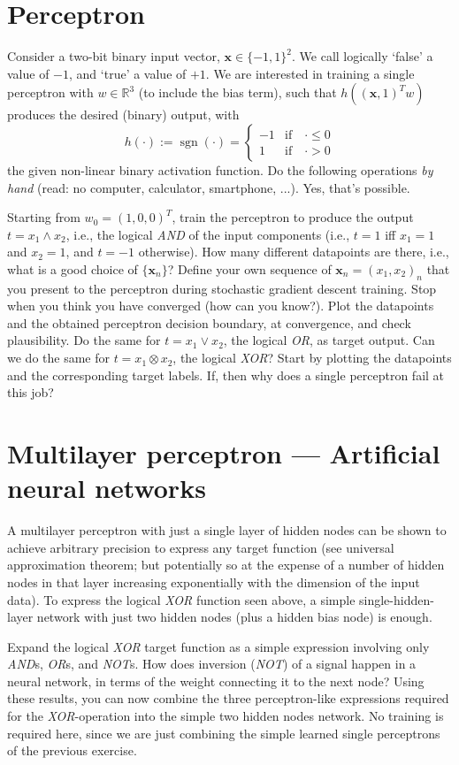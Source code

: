 \documentclass[11pt,noanswers,addpoints]{exam}
\DeclareMathOperator{\sgn}{sgn}
\newcommand{\R}{\mathbb R}
\newcommand{\x}{\mathbf x}
\begin{document}
\section{Perceptron}
Consider a two-bit binary input vector, $\x \in \{-1,1\}^2$. We call logically `false' a value of $-1$, and `true' a value of $+1$. We are interested in training a single perceptron with $w\in\R^3$ (to include the bias term), such that $h( (\x,1)^Tw )$ produces the desired (binary) output, with $$h(\cdot):=\sgn(\cdot)=\begin{cases}-1&\text{if} \quad \cdot \leq 0\\ 1& \text{if} \quad \cdot > 0 \end{cases}$$ the given non-linear binary activation function. Do the following operations \emph{by hand} (read: no computer, calculator, smartphone, ...). Yes, that's possible.
\begin{questions}
\question Starting from $w_0=(1,0,0)^T$, train the perceptron to produce the output $t=x_1\wedge x_2$, i.e., the logical \emph{AND} of the input components (i.e., $t=1$ iff $x_1=1$ and $x_2=1$, and $t=-1$ otherwise). How many different datapoints are there, i.e., what is a good choice of $\{\x_n\}$? Define your own sequence of $\x_n=(x_1,x_2)_n$ that you present to the perceptron during stochastic gradient descent training. Stop when you think you have converged (how can you know?). Plot the datapoints and the obtained perceptron decision boundary, at convergence, and check plausibility.
\question Do the same for $t=x_1\vee x_2$, the logical \emph{OR}, as target output.
\question Can we do the same for $t=x_1\otimes x_2$, the logical \emph{XOR}? Start by plotting the datapoints and the corresponding target labels. If, then why does a single perceptron fail at this job?
\end{questions}



\section{Multilayer perceptron --- Artificial neural networks}
A multilayer perceptron with just a single layer of hidden nodes can be shown to achieve arbitrary precision to express any target function (see universal approximation theorem; but potentially so at the expense of a number of hidden nodes in that layer increasing exponentially with the dimension of the input data). To express the logical \emph{XOR} function seen above, a simple single-hidden-layer network with just two hidden nodes (plus a hidden bias node) is enough.
\begin{questions}
\question Expand the logical \emph{XOR} target function as a simple expression involving only \emph{AND}s, \emph{OR}s, and \emph{NOT}s. 
\question How does inversion (\emph{NOT}) of a signal happen in a neural network, in terms of the weight connecting it to the next node?
\question Using these results, you can now combine the three perceptron-like expressions required for the \emph{XOR}-operation into the simple two hidden nodes network. No training is required here, since we are just combining the simple learned single perceptrons of the previous exercise.
\end{questions}
\end{document}
